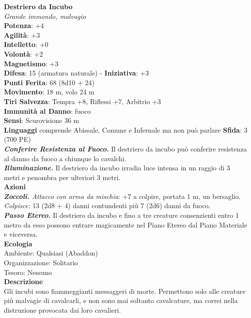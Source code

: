 \begin{multicols}{2}
\medskip\textbf{Destriero da Incubo}\\
\emph{Grande immondo, malvagio}\\
\textbf{Potenza}: +4\\
\textbf{Agilità}: +3\\
\textbf{Intelletto}: +0\\
\textbf{Volontà}: +2\\
\textbf{Magnetismo}: +3\\
\textbf{Difesa}: 15 (armatura naturale) - \textbf{Iniziativa}: +3\\
\textbf{Punti Ferita}: 68 (8d10 + 24)\\
\textbf{Movimento}: 18 m, volo 24 m\\
\textbf{Tiri Salvezza}: Tempra +8, Riflessi +7, Arbitrio +3\\
\textbf{Immunità al Danno}: fuoco\\
\textbf{Sensi}: Scurovisione 36 m\\
\textbf{Linguaggi} comprende Abissale, Comune e Infernale ma non può parlare
\textbf{Sfida}: 3 (700 PE)\smallskip\\
\emph{\textbf{Conferire Resistenza al Fuoco.}} Il destriero da incubo può conferire resistenza al danno da fuoco a chiunque lo cavalchi.\\
\emph{\textbf{Illuminazione.}} Il destriero da incubo irradia luce intensa in un raggio di 3 metri e penombra per ulteriori 3 metri.\\
\smallskip\textbf{Azioni}\\
\emph{\textbf{Zoccoli.} Attacco con arma da mischia}: +7 a colpire, portata 1 m, un bersaglio.\\
\emph{Colpisce:} 13 (2d8 + 4) danni contundenti più 7 (2d6) danni da fuoco.\\
\emph{\textbf{Passo Etereo.}} Il destriero da incubo e fino a tre creature consenzienti entro 1 metro da esso possono entrare magicamente nel Piano Etereo dal Piano Materiale e viceversa.\\
\textbf{Ecologia}\\
Ambiente: Qualsiasi (Abaddon)\\
Organizzazione: Solitario\\
Tesoro: Nessuno\\
\textbf{Descrizione}\\
Gli incubi sono fiammeggianti messaggeri di morte. Permettono solo alle creature più malvagie di cavalcarli, e non sono mai soltanto cavalcature, ma correi nella distruzione provocata dai loro cavalieri.\\


\end{multicols}
